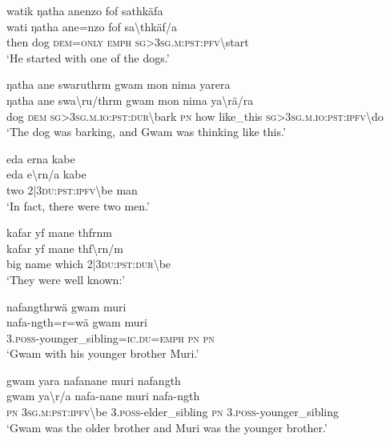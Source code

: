 \ea\label{ex:1:a3534}
watik ŋatha anenzo fof sathkäfa\\
\gll wati	ŋatha	ane=nzo	fof	sa{\textbackslash}thkäf/a\\
     then	dog	\textsc{dem}=\textsc{only}	\textsc{emph}	\textsc{sg}>3\textsc{sg}.\textsc{m}:\textsc{pst}:\textsc{pfv}{\textbackslash}start\\
\glt `He started with one of the dogs.'
\z

\ea\label{ex:1:a3535}
ŋatha ane swaruthrm gwam mon nima yarera\\
\gll ŋatha	ane	swa{\textbackslash}ru/thrm	gwam	mon	nima	ya{\textbackslash}rä/ra\\
     dog	\textsc{dem}	\textsc{sg}>3\textsc{sg}.\textsc{m}.\textsc{io}:\textsc{pst}:\textsc{dur}{\textbackslash}bark	\textsc{pn}	how	like\_this	\textsc{sg}>3\textsc{sg}.\textsc{m}.\textsc{io}:\textsc{pst}:\textsc{ipfv}{\textbackslash}do\\
\glt `The dog was barking, and Gwam was thinking like this.'
\z

\ea\label{ex:1:a3536}
eda erna kabe\\
\gll eda	e{\textbackslash}rn/a	kabe\\
     two	2|3\textsc{du}:\textsc{pst}:\textsc{ipfv}{\textbackslash}be	man\\
\glt `In fact, there were two men.'
\z

\ea\label{ex:1:a3537}
kafar yf mane thfrnm\\
\gll kafar	yf	mane	thf{\textbackslash}rn/m\\
     big	name	which	2|3\textsc{du}:\textsc{pst}:\textsc{dur}{\textbackslash}be\\
\glt `They were well known:'
\z

\ea\label{ex:1:a3538}
nafangthrwä gwam muri\\
\gll nafa-ngth=r=wä	gwam	muri\\
     3.\textsc{poss}-younger\_sibling=\textsc{ic}.\textsc{du}=\textsc{emph}	\textsc{pn}	\textsc{pn}\\
\glt `Gwam with his younger brother Muri.'
\z

\ea\label{ex:1:a3540}
gwam yara nafanane muri nafangth\\
\gll gwam	ya{\textbackslash}r/a	nafa-nane	muri	nafa-ngth\\
     \textsc{pn}	3\textsc{sg}.\textsc{m}:\textsc{pst}:\textsc{ipfv}{\textbackslash}be	3.\textsc{poss}-elder\_sibling	\textsc{pn}	3.\textsc{poss}-younger\_sibling\\
\glt `Gwam was the older brother and Muri was the younger brother.'
\z

